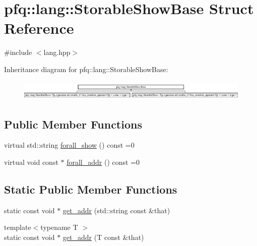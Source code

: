 \hypertarget{structpfq_1_1lang_1_1StorableShowBase}{\section{pfq\+:\+:lang\+:\+:Storable\+Show\+Base Struct Reference}
\label{structpfq_1_1lang_1_1StorableShowBase}
}


{\ttfamily \#include $<$lang.\+hpp$>$}

Inheritance diagram for pfq\+:\+:lang\+:\+:Storable\+Show\+Base\+:\begin{figure}[H]
\begin{center}
\leavevmode
\includegraphics[height=0.957265cm]{structpfq_1_1lang_1_1StorableShowBase}
\end{center}
\end{figure}
\subsection*{Public Member Functions}
\begin{DoxyCompactItemize}
\item 
virtual std\+::string \hyperlink{structpfq_1_1lang_1_1StorableShowBase_a1c6d20492a999c961c1120dce33a131d}{forall\+\_\+show} () const =0
\item 
virtual void const $\ast$ \hyperlink{structpfq_1_1lang_1_1StorableShowBase_a4b7712509609a2cb18dccf6b699d6ed9}{forall\+\_\+addr} () const =0
\end{DoxyCompactItemize}
\subsection*{Static Public Member Functions}
\begin{DoxyCompactItemize}
\item 
static const void $\ast$ \hyperlink{structpfq_1_1lang_1_1StorableShowBase_a716426f3a3c0a37e5cbce068dc18cda5}{get\+\_\+addr} (std\+::string const \&that)
\item 
{\footnotesize template$<$typename T $>$ }\\static const void $\ast$ \hyperlink{structpfq_1_1lang_1_1StorableShowBase_abbf4497b2a5de3ee38e9ee1c7ffd734d}{get\+\_\+addr} (T const \&that)
\end{DoxyCompactItemize}


